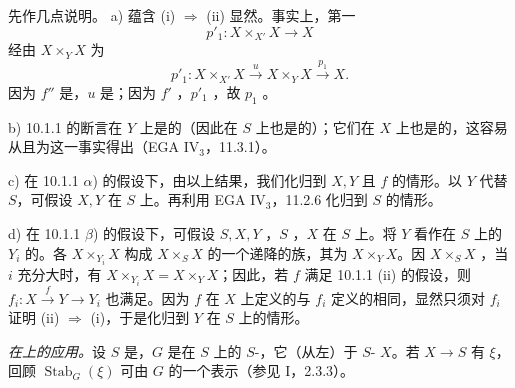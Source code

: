 先作几点说明。
a) 蕴含 (i) $\Rightarrow$ (ii) 显然。事实上，第一
\[
p'_1:X\times_{X'}X\longrightarrow X
\]
经由 $X\times_YX$ 为
\[
p'_1:X\times_{X'}X\xrightarrow{u}X\times_YX\xrightarrow{p_1}X.
\]
因为 $f''$ 是，$u$ 是；因为 $f'$ ，$p'_1$ ，故 $p_1$ 。

b) 10.1.1 的断言在 $Y$ 上是的（因此在 $S$ 上也是的）；它们在 $X$ 上也是的，这容易从且为这一事实得出（EGA IV$_3$，11.3.1）。

c) 在 10.1.1 $\alpha$) 的假设下，由以上结果，我们化归到 $X,Y$ 且 $f$ 的情形。以 $Y$ 代替 $S$，可假设 $X,Y$ 在 $S$ 上。再利用 EGA IV$_3$，11.2.6 化归到 $S$ 的情形。

d) 在 10.1.1 $\beta$) 的假设下，可假设 $S,X,Y$ ，$S$ ，$X$ 在 $S$ 上。将 $Y$ 看作在 $S$ 上的 $Y_i$ 的。各 $X\times_{Y_i}X$ 构成 $X\times_SX$ 的一个递降的族，其为 $X\times_YX$。因 $X\times_SX$ ，当 $i$ 充分大时，有 $X\times_{Y_i}X=X\times_YX$；因此，若 $f$ 满足 10.1.1 (ii) 的假设，则 $f_i:X\xrightarrow{f}Y\to Y_i$ 也满足。因为 $f$ 在 $X$ 上定义的与 $f_i$ 定义的相同，显然只须对 $f_i$ 证明 (ii) $\Rightarrow$ (i)，于是化归到 $Y$ 在 $S$ 上的情形。

\textit{在上的应用。}设 $S$ 是，$G$ 是在 $S$ 上的 $S$-，它（从左）于 $S$- $X$。若 $X\to S$ 有 $\xi$，回顾 $\operatorname{Stab}_G(\xi)$ 可由 $G$ 的一个表示（参见 I，2.3.3）。


